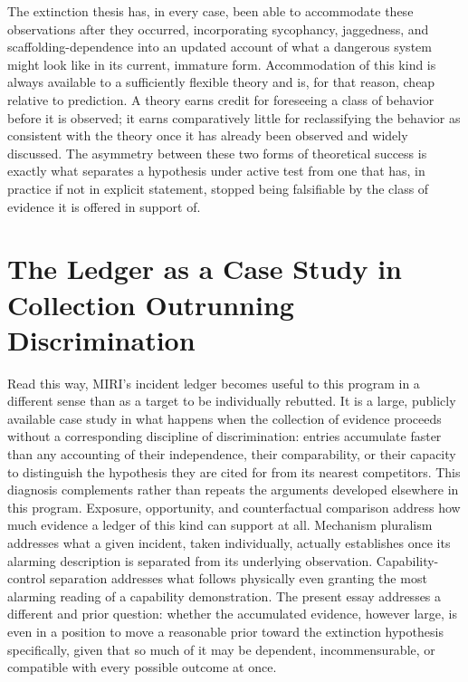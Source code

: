 \documentclass[11pt]{article}
\begin{document}
The extinction thesis has, in every case, been able to accommodate these observations after they occurred, incorporating sycophancy, jaggedness, and scaffolding-dependence into an updated account of what a dangerous system might look like in its current, immature form. Accommodation of this kind is always available to a sufficiently flexible theory and is, for that reason, cheap relative to prediction. A theory earns credit for foreseeing a class of behavior before it is observed; it earns comparatively little for reclassifying the behavior as consistent with the theory once it has already been observed and widely discussed. The asymmetry between these two forms of theoretical success is exactly what separates a hypothesis under active test from one that has, in practice if not in explicit statement, stopped being falsifiable by the class of evidence it is offered in support of.

\section{The Ledger as a Case Study in Collection Outrunning Discrimination}

Read this way, MIRI's incident ledger becomes useful to this program in a different sense than as a target to be individually rebutted. It is a large, publicly available case study in what happens when the collection of evidence proceeds without a corresponding discipline of discrimination: entries accumulate faster than any accounting of their independence, their comparability, or their capacity to distinguish the hypothesis they are cited for from its nearest competitors. This diagnosis complements rather than repeats the arguments developed elsewhere in this program. Exposure, opportunity, and counterfactual comparison address how much evidence a ledger of this kind can support at all. Mechanism pluralism addresses what a given incident, taken individually, actually establishes once its alarming description is separated from its underlying observation. Capability-control separation addresses what follows physically even granting the most alarming reading of a capability demonstration. The present essay addresses a different and prior question: whether the accumulated evidence, however large, is even in a position to move a reasonable prior toward the extinction hypothesis specifically, given that so much of it may be dependent, incommensurable, or compatible with every possible outcome at once.
\end{document}

